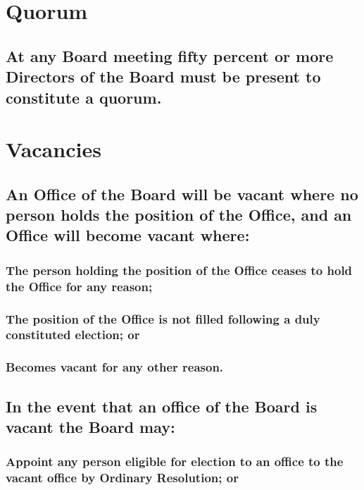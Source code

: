 \documentclass{article}
\newenvironment{subs}
  {\adjustwidth{2em}{0pt}}
  {\endadjustwidth}
\begin{document}
\begin{subs}
\begin{subs}
\section{Quorum}
\begin{subs}
\begin{subs}
\subsection{At any Board meeting fifty percent or more Directors of the Board must be present to constitute a quorum.}

\end{subs}
\end{subs}

\section{Vacancies}
\begin{subs}
\subsection{An Office of the Board will be vacant where no person holds the position of the Office, and an Office will become vacant where:}
\begin{subs}
\subsubsection{The person holding the position of the Office ceases to hold the Office for any reason;}
\subsubsection{The position of the Office is not filled following a duly constituted election; or}
\subsubsection{Becomes vacant for any other reason.}
\end{subs}
\subsection{In the event that an office of the Board is vacant the Board may: }
\begin{subs}
\subsubsection{Appoint any person eligible for election to an office to the vacant office by Ordinary Resolution; or}

\end{subs}
\end{subs}
\end{subs}
\end{subs}
\end{document}
